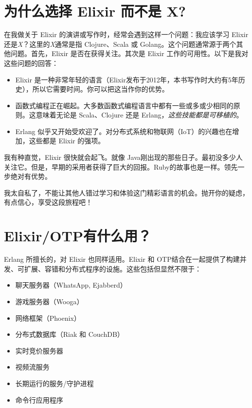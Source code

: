 \section{为什么选择 Elixir 而不是 X?}

在我做关于 Elixir 的演讲或写作时，经常会遇到这样一个问题：我应该学习
Elixir 还是\emph{X}？这里的\emph{X}通常是指 Clojure、Scala 或
Golang。这个问题通常源于两个其他问题。首先，Elixir
是否在获得关注。其次是 Elixir 工作的可用性。以下是我对这些问题的回答：

\begin{itemize}

\item  Elixir  是一种非常年轻的语言（Elixir发布于2012年，本书写作时大约有5年历史），所以它需要时间。你可以把这当作你的优势。
\item  函数式编程正在崛起。大多数函数式编程语言中都有一些或多或少相同的原则。这意味着无论是  Scala、Clojure 还是 Erlang，\emph{这些技能都是可移植的}。
\item  Erlang  似乎又开始受欢迎了。对分布式系统和物联网（IoT）的兴趣也在增加，这些都是  Elixir 的强项。
\end{itemize}

我有种直觉，Elixir 很快就会起飞。就像 Java刚出现的那些日子。最初没多少人关注它。但是，早期的采用者获得了巨大的回报。Ruby的故事也是一样。领先一步绝对有优势。

我太自私了，不能让其他人错过学习和体验这门精彩语言的机会。抛开你的疑虑，有点信心，享受这段旅程吧！


\section{Elixir/OTP有什么用？}

Erlang 所擅长的，对 Elixir 也同样适用。Elixir 和 OTP结合在一起提供了构建并发、可扩展、容错和分布式程序的设施。这些包括但显然不限于：

\begin{itemize}

\item  聊天服务器（WhatsApp, Ejabberd）
\item  游戏服务器（Wooga）
\item  网络框架（Phoenix）
\item  分布式数据库（Riak 和 CouchDB）
\item  实时竞价服务器
\item  视频流服务
\item  长期运行的服务/守护进程
\item  命令行应用程序
\end{itemize}

